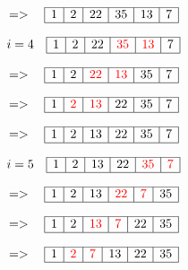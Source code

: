 \documentclass{article}
\begin{document}
\[
    \quad => \quad
\begin{array}{|c|c|c|c|c|c|}
\hline
1 & 2 & 22 &  35 &  13 & 7 \\   
\hline
\end{array}
\]

\[
    \quad i = 4 \quad
\begin{array}{|c|c|c|c|c|c|}
\hline
1 & 2 & 22 &  \textcolor{red}{35} &  \textcolor{red}{13} & 7 \\  
\hline
\end{array}
\]

\[
    \quad => \quad
\begin{array}{|c|c|c|c|c|c|}
\hline
1 & 2 & \textcolor{red}{22} &  \textcolor{red}{13} &  35 & 7 \\  
\hline
\end{array}
\]

\[
    \quad => \quad
\begin{array}{|c|c|c|c|c|c|}
\hline
1 & \textcolor{red}{2} & \textcolor{red}{13} &  22 &  35 & 7 \\  
\hline
\end{array}
\]

\[
    \quad => \quad
\begin{array}{|c|c|c|c|c|c|}
\hline
1 & 2 & 13 &  22 &  35 & 7 \\  
\hline
\end{array}
\]

\[
    \quad i = 5 \quad
\begin{array}{|c|c|c|c|c|c|}
\hline
1 & 2 & 13 &  22 &  \textcolor{red}{35} & \textcolor{red}{7} \\  
\hline
\end{array}
\]

\[
    \quad => \quad
\begin{array}{|c|c|c|c|c|c|}
\hline
1 & 2 & 13 &  \textcolor{red}{22} &  \textcolor{red}{7} & 35 \\  
\hline
\end{array}
\]

\[
    \quad => \quad
\begin{array}{|c|c|c|c|c|c|}
\hline
1 & 2 & \textcolor{red}{13} &  \textcolor{red}{7} &  22 & 35 \\  
\hline
\end{array}
\]

\[
    \quad => \quad
\begin{array}{|c|c|c|c|c|c|}
\hline
1 & \textcolor{red}{2} & \textcolor{red}{7} &  13 &  22 & 35 \\  
\hline
\end{array}
\]
\end{document}
